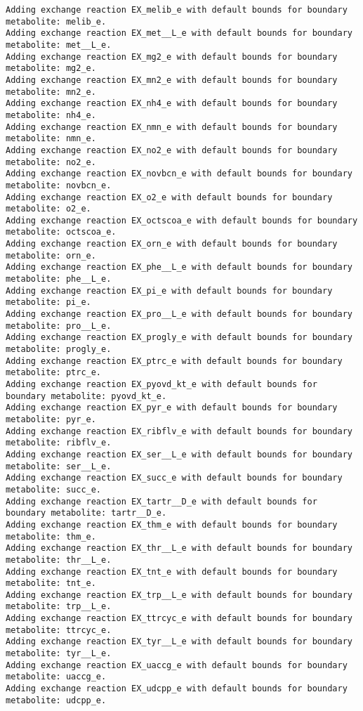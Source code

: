 \documentclass[
  letterpaper,
  DIV=11,
  numbers=noendperiod]{scrartcl}
\begin{document}
\begin{verbatim}
Adding exchange reaction EX_melib_e with default bounds for boundary metabolite: melib_e.
Adding exchange reaction EX_met__L_e with default bounds for boundary metabolite: met__L_e.
Adding exchange reaction EX_mg2_e with default bounds for boundary metabolite: mg2_e.
Adding exchange reaction EX_mn2_e with default bounds for boundary metabolite: mn2_e.
Adding exchange reaction EX_nh4_e with default bounds for boundary metabolite: nh4_e.
Adding exchange reaction EX_nmn_e with default bounds for boundary metabolite: nmn_e.
Adding exchange reaction EX_no2_e with default bounds for boundary metabolite: no2_e.
Adding exchange reaction EX_novbcn_e with default bounds for boundary metabolite: novbcn_e.
Adding exchange reaction EX_o2_e with default bounds for boundary metabolite: o2_e.
Adding exchange reaction EX_octscoa_e with default bounds for boundary metabolite: octscoa_e.
Adding exchange reaction EX_orn_e with default bounds for boundary metabolite: orn_e.
Adding exchange reaction EX_phe__L_e with default bounds for boundary metabolite: phe__L_e.
Adding exchange reaction EX_pi_e with default bounds for boundary metabolite: pi_e.
Adding exchange reaction EX_pro__L_e with default bounds for boundary metabolite: pro__L_e.
Adding exchange reaction EX_progly_e with default bounds for boundary metabolite: progly_e.
Adding exchange reaction EX_ptrc_e with default bounds for boundary metabolite: ptrc_e.
Adding exchange reaction EX_pyovd_kt_e with default bounds for boundary metabolite: pyovd_kt_e.
Adding exchange reaction EX_pyr_e with default bounds for boundary metabolite: pyr_e.
Adding exchange reaction EX_ribflv_e with default bounds for boundary metabolite: ribflv_e.
Adding exchange reaction EX_ser__L_e with default bounds for boundary metabolite: ser__L_e.
Adding exchange reaction EX_succ_e with default bounds for boundary metabolite: succ_e.
Adding exchange reaction EX_tartr__D_e with default bounds for boundary metabolite: tartr__D_e.
Adding exchange reaction EX_thm_e with default bounds for boundary metabolite: thm_e.
Adding exchange reaction EX_thr__L_e with default bounds for boundary metabolite: thr__L_e.
Adding exchange reaction EX_tnt_e with default bounds for boundary metabolite: tnt_e.
Adding exchange reaction EX_trp__L_e with default bounds for boundary metabolite: trp__L_e.
Adding exchange reaction EX_ttrcyc_e with default bounds for boundary metabolite: ttrcyc_e.
Adding exchange reaction EX_tyr__L_e with default bounds for boundary metabolite: tyr__L_e.
Adding exchange reaction EX_uaccg_e with default bounds for boundary metabolite: uaccg_e.
Adding exchange reaction EX_udcpp_e with default bounds for boundary metabolite: udcpp_e.

\end{verbatim}
\end{document}
